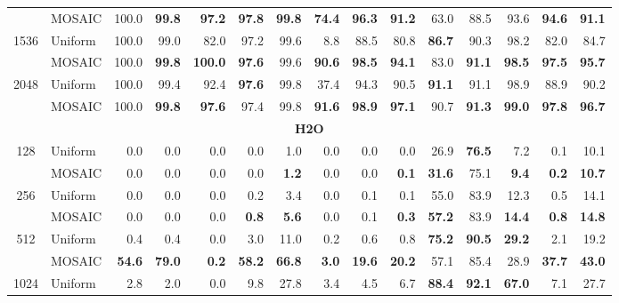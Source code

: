 \begin{table}[tp]
\begin{tabular}{@{} c l rrrrrrrrrrrrr @{}}
     & MOSAIC & 100.0 & \textbf{99.8} & \textbf{97.2} & \textbf{97.8} & \textbf{99.8} & \textbf{74.4} & \textbf{96.3} & \textbf{91.2} & 63.0 & 88.5 & 93.6 & \textbf{94.6} & \textbf{91.1} \\
    \cmidrule(l){1-15}
    \multirow{2}{*}{1536} & Uniform & 100.0 & 99.0 & 82.0 & 97.2 & 99.6 & 8.8 & 88.5 & 80.8 & \textbf{86.7} & 90.3 & 98.2 & 82.0 & 84.7 \\
     & MOSAIC & 100.0 & \textbf{99.8} & \textbf{100.0} & \textbf{97.6} & 99.6 & \textbf{90.6} & \textbf{98.5} & \textbf{94.1} & 83.0 & \textbf{91.1} & \textbf{98.5} & \textbf{97.5} & \textbf{95.7} \\
    \cmidrule(l){1-15}
    \multirow{2}{*}{2048} & Uniform & 100.0 & 99.4 & 92.4 & \textbf{97.6} & 99.8 & 37.4 & 94.3 & 90.5 & \textbf{91.1} & 91.1 & 98.9 & 88.9 & 90.2 \\
     & MOSAIC & 100.0 & \textbf{99.8} & \textbf{97.6} & 97.4 & 99.8 & \textbf{91.6} & \textbf{98.9} & \textbf{97.1} & 90.7 & \textbf{91.3} & \textbf{99.0} & \textbf{97.8} & \textbf{96.7} \\
    \midrule
    \multicolumn{15}{c}{\textbf{H2O}} \\
    \midrule
    \multirow{2}{*}{128} & Uniform & 0.0 & 0.0 & 0.0 & 0.0 & 1.0 & 0.0 & 0.0 & 0.0 & 26.9 & \textbf{76.5} & 7.2 & 0.1 & 10.1 \\
     & MOSAIC & 0.0 & 0.0 & 0.0 & 0.0 & \textbf{1.2} & 0.0 & 0.0 & \textbf{0.1} & \textbf{31.6} & 75.1 & \textbf{9.4} & \textbf{0.2} & \textbf{10.7} \\
    \cmidrule(l){1-15}
    \multirow{2}{*}{256} & Uniform & 0.0 & 0.0 & 0.0 & 0.2 & 3.4 & 0.0 & 0.1 & 0.1 & 55.0 & 83.9 & 12.3 & 0.5 & 14.1 \\
     & MOSAIC & 0.0 & 0.0 & 0.0 & \textbf{0.8} & \textbf{5.6} & 0.0 & 0.1 & \textbf{0.3} & \textbf{57.2} & 83.9 & \textbf{14.4} & \textbf{0.8} & \textbf{14.8} \\
    \cmidrule(l){1-15}
    \multirow{2}{*}{512} & Uniform & 0.4 & 0.4 & 0.0 & 3.0 & 11.0 & 0.2 & 0.6 & 0.8 & \textbf{75.2} & \textbf{90.5} & \textbf{29.2} & 2.1 & 19.2 \\
     & MOSAIC & \textbf{54.6} & \textbf{79.0} & \textbf{0.2} & \textbf{58.2} & \textbf{66.8} & \textbf{3.0} & \textbf{19.6} & \textbf{20.2} & 57.1 & 85.4 & 28.9 & \textbf{37.7} & \textbf{43.0} \\
    \cmidrule(l){1-15}
    \multirow{2}{*}{1024} & Uniform & 2.8 & 2.0 & 0.0 & 9.8 & 27.8 & 3.4 & 4.5 & 6.7 & \textbf{88.4} & \textbf{92.1} & \textbf{67.0} & 7.1 & 27.7 \\

\end{tabular}
\end{table}
